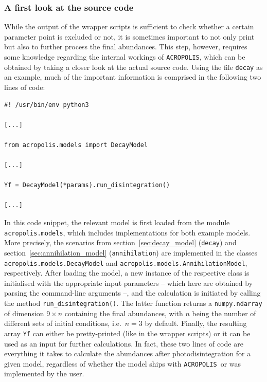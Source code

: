\documentclass[11pt,a4paper]{article}
\newcommand{\acropolis}{\texttt{ACROPOLIS}~}
\begin{document}
\subsubsection{A first look at the source code}
While the output of the wrapper scripts is sufficient to check whether a certain parameter point is excluded or not, it is sometimes important to not only print but also to further process the final abundances. This step, however, requires some knowledge regarding the internal workings of \texttt{ACROPOLIS}, which can be obtained by taking a closer look at the actual source code. Using the file \texttt{decay} as an example, much of the important information is comprised in the following two lines of code:
\begin{lstlisting}
#! /usr/bin/env python3

[...]

from acropolis.models import DecayModel

[...]

Yf = DecayModel(*params).run_disintegration()

[...]
\end{lstlisting}
In this code snippet, the relevant model is first loaded from the module \texttt{acropolis.models}, which includes implementations for both example models. More precisely, the scenarios from section~\ref{sec:decay_model} (\texttt{decay}) and section~\ref{sec:annihilation_model} (\texttt{annihilation}) are implemented in the classes \texttt{acropolis.models.DecayModel} and \texttt{acropolis.models.AnnihilationModel}, respectively. After loading the model, a new instance of the respective class is initialised with the appropriate input parameters -- which here are obtained by parsing the command-line arguments --, and the calculation is initiated by calling the method \texttt{run\_disintegration()}. The latter function returns a \texttt{numpy.ndarray} of dimension $9\times n$ containing the final abundances, with $n$ being the number of different sets of initial conditions, i.e.\ $n=3$ by default. Finally, the resulting array \texttt{Yf} can either be pretty-printed (like in the wrapper scripts) or it can be used as an input for further calculations. In fact, these two lines of code are everything it takes to calculate the abundances after photodisintegration for a given model, regardless of whether the model ships with \acropolis or was implemented by the user.
\end{document}
